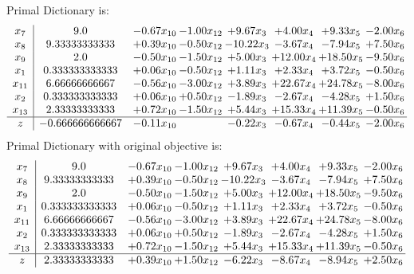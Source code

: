 \documentclass[8pt]{article}
\begin{document}
Primal Dictionary is:
\[\begin{array}{c| c c@{\hskip 2pt} c@{\hskip 2pt} c@{\hskip 2pt} c@{\hskip 2pt} c@{\hskip 2pt} c@{\hskip 2pt} }
 x_{7}   &  9.0 & -0.67 x_{10} & -1.00 x_{12} & +  9.67 x_{3} & +  4.00 x_{4} & +  9.33 x_{5} & -2.00 x_{6}\\
 x_{8}   &  9.33333333333 & +  0.39 x_{10} & -0.50 x_{12} & -10.22 x_{3} & -3.67 x_{4} & -7.94 x_{5} & +  7.50 x_{6}\\
 x_{9}   &  2.0 & -0.50 x_{10} & -1.50 x_{12} & +  5.00 x_{3} & + 12.00 x_{4} & + 18.50 x_{5} & -9.50 x_{6}\\
 x_{1}   &  0.333333333333 & +  0.06 x_{10} & -0.50 x_{12} & +  1.11 x_{3} & +  2.33 x_{4} & +  3.72 x_{5} & -0.50 x_{6}\\
 x_{11}   &  6.66666666667 & -0.56 x_{10} & -3.00 x_{12} & +  3.89 x_{3} & + 22.67 x_{4} & + 24.78 x_{5} & -8.00 x_{6}\\
 x_{2}   &  0.333333333333 & +  0.06 x_{10} & +  0.50 x_{12} & -1.89 x_{3} & -2.67 x_{4} & -4.28 x_{5} & +  1.50 x_{6}\\
 x_{13}   &  2.33333333333 & +  0.72 x_{10} & -1.50 x_{12} & +  5.44 x_{3} & + 15.33 x_{4} & + 11.39 x_{5} & -0.50 x_{6}\\
\hline
z    &  -0.666666666667 & -0.11 x_{10} &   & -0.22 x_{3} & -0.67 x_{4} & -0.44 x_{5} & -2.00 x_{6}\\
\end{array}\]
Primal Dictionary with original objective is:
\[\begin{array}{c| c c@{\hskip 2pt} c@{\hskip 2pt} c@{\hskip 2pt} c@{\hskip 2pt} c@{\hskip 2pt} c@{\hskip 2pt} }
 x_{7}   &  9.0 & -0.67 x_{10} & -1.00 x_{12} & +  9.67 x_{3} & +  4.00 x_{4} & +  9.33 x_{5} & -2.00 x_{6}\\
 x_{8}   &  9.33333333333 & +  0.39 x_{10} & -0.50 x_{12} & -10.22 x_{3} & -3.67 x_{4} & -7.94 x_{5} & +  7.50 x_{6}\\
 x_{9}   &  2.0 & -0.50 x_{10} & -1.50 x_{12} & +  5.00 x_{3} & + 12.00 x_{4} & + 18.50 x_{5} & -9.50 x_{6}\\
 x_{1}   &  0.333333333333 & +  0.06 x_{10} & -0.50 x_{12} & +  1.11 x_{3} & +  2.33 x_{4} & +  3.72 x_{5} & -0.50 x_{6}\\
 x_{11}   &  6.66666666667 & -0.56 x_{10} & -3.00 x_{12} & +  3.89 x_{3} & + 22.67 x_{4} & + 24.78 x_{5} & -8.00 x_{6}\\
 x_{2}   &  0.333333333333 & +  0.06 x_{10} & +  0.50 x_{12} & -1.89 x_{3} & -2.67 x_{4} & -4.28 x_{5} & +  1.50 x_{6}\\
 x_{13}   &  2.33333333333 & +  0.72 x_{10} & -1.50 x_{12} & +  5.44 x_{3} & + 15.33 x_{4} & + 11.39 x_{5} & -0.50 x_{6}\\
\hline
z    &  2.33333333333 & +  0.39 x_{10} & +  1.50 x_{12} & -6.22 x_{3} & -8.67 x_{4} & -8.94 x_{5} & +  2.50 x_{6}\\
\end{array}\]
\end{document}
